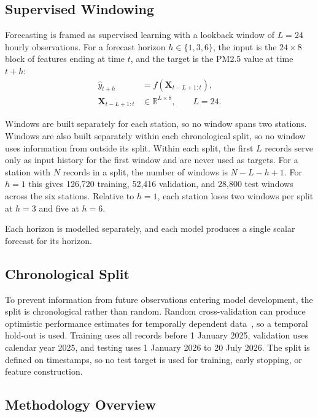 \documentclass[conference]{IEEEtran}
\begin{document}
\subsection{Supervised Windowing}
Forecasting is framed as supervised learning with a lookback window of \(L=24\) hourly observations. For a forecast horizon \(h \in \{1,3,6\}\), the input is the \(24\times 8\) block of features ending at time \(t\), and the target is the PM2.5 value at time \(t+h\):
\begin{equation}
\begin{aligned}
\hat{y}_{t+h} &= f\!\left(\mathbf{X}_{t-L+1:t}\right),\\
\mathbf{X}_{t-L+1:t} &\in \mathbb{R}^{L\times 8}, \qquad L=24.
\end{aligned}
\end{equation}

Windows are built separately for each station, so no window spans two stations. Windows are also built separately within each chronological split, so no window uses information from outside its split. Within each split, the first \(L\) records serve only as input history for the first window and are never used as targets. For a station with \(N\) records in a split, the number of windows is \(N-L-h+1\). For \(h=1\) this gives 126,720 training, 52,416 validation, and 28,800 test windows across the six stations. Relative to \(h=1\), each station loses two windows per split at \(h=3\) and five at \(h=6\).

Each horizon is modelled separately, and each model produces a single scalar forecast for its horizon.

\subsection{Chronological Split}
To prevent information from future observations entering model development, the split is chronological rather than random. Random cross-validation can produce optimistic performance estimates for temporally dependent data~\cite{marfath2026}, so a temporal hold-out is used. Training uses all records before 1 January 2025, validation uses calendar year 2025, and testing uses 1 January 2026 to 20 July 2026. The split is defined on timestamps, so no test target is used for training, early stopping, or feature construction.

\subsection{Methodology Overview}
\end{document}
